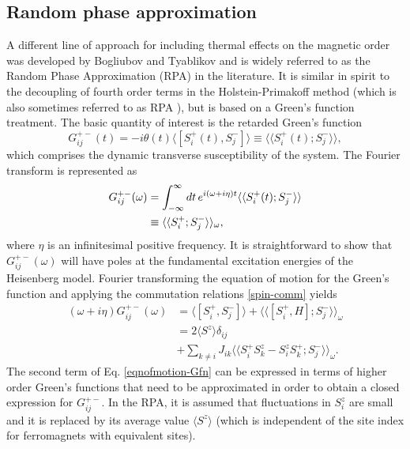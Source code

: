 \documentclass[aps,prb,reprint,floatfix,superscriptaddress]{revtex4-2}
\begin{document}
\subsection{Random phase approximation}
A different line of approach for including thermal effects on the magnetic order was developed by Bogliubov and Tyablikov \cite{tyablikov1959} and is widely referred to as the Random Phase Approximation (RPA) in the literature. It is similar in spirit to the decoupling of fourth order terms in the Holstein-Primakoff method (which is also sometimes referred to as RPA \cite{Yosida1996}), but is based on a Green's function treatment. The basic quantity of interest is the retarded Green's function
\begin{equation}\label{arbGfn-def}
    G_{ij}^{+-}(t) = -i \theta(t)\langle [S_i^+(t), S_j^-] \rangle\equiv\langle\langle S_i^+(t); S_j^-\rangle\rangle,
\end{equation}
which comprises the dynamic transverse susceptibility of the system. The Fourier transform is represented as
\begin{align}\label{arbGfn-def_fourier}
    G_{ij}^{+-}(\omega) &= \int_{-\infty}^\infty dt\, e^{i(\omega+i\eta)t}\langle\langle S_i^+(t); S_j^- \rangle\rangle\notag\\&\equiv\langle\langle S_i^+; S_j^- \rangle\rangle_\omega,
\end{align}
where $\eta$ is an infinitesimal positive frequency. It is straightforward to show that $G_{ij}^{+-}(\omega)$ will have poles at the fundamental excitation energies of the Heisenberg model.
Fourier transforming the equation of motion for the Green's function and applying the commutation relations \eqref{spin-comm} yields
\begin{subequations}
\begin{align}\label{eqnofmotion-Gfn}
(\omega+i\eta)G_{ij}^{+-}(\omega) &= 
\langle [S^+_i, S^-_j] \rangle + \langle \langle [S_i^+ , H]; S_{j}^- \rangle \rangle_\omega \\
&= 2\langle S^z\rangle \delta_{ij} \nonumber\\
&+ \sum_{k\neq i} J_{ik}\langle \langle S_i^+ S^z_k - S^z_i S_k^+; S_{j}^- \rangle \rangle_\omega.
\label{eq:eom after comm}
\end{align}
\end{subequations}
The second term of Eq. \eqref{eqnofmotion-Gfn} can be expressed in terms of higher order Green's functions that need to be approximated in order to obtain a closed expression for $G^{+-}_{ij}$.
In the RPA, it is assumed that fluctuations in $S_i^z$ are small and it is replaced by its average value $\langle S^z\rangle$ (which is independent of the site index for ferromagnets with equivalent sites).
\end{document}
